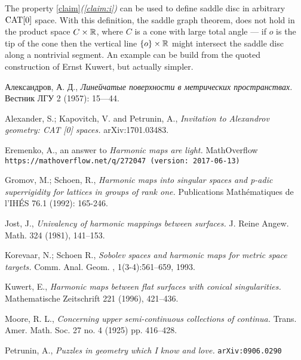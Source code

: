 \documentclass{article}
\begin{document}
The property \ref{claim}\textit{(\ref{claim:i})} can be used to define saddle disc in arbitrary $\mathop{\rm CAT}\nolimits[0]$ space.
With this definition, the saddle graph theorem, does not hold in the product space $C\times \mathbb{R}$, where $C$ is a cone with large total angle --- if $o$ is the tip of the cone then the vertical line $\{o\}\times\mathbb{R}$ might intersect the saddle disc along a nontrivial segment.
An example can be build from the quoted construction of Ernst Kuwert, but actually simpler.


\begin{thebibliography}{52}

 \begin{otherlanguage}{russian}
Александров, А. Д., 
\textit{Линейчатые поверхности в метрических пространствах.}
Вестник ЛГУ 2 (1957): 15---44.
\end{otherlanguage}

Alexander, S.; Kapovitch, V. and Petrunin, A.,
\textit{Invitation to Alexandrov geometry: CAT [0] spaces.}
arXiv:1701.03483.

 Eremenko, A., 
an answer to \textit{Harmonic maps are light.} MathOverflow
\texttt{https://mathoverflow.net/q/272047 (version: 2017-06-13)}

 Gromov, M.; Schoen, R., 
\textit{Harmonic maps into singular spaces and p-adic superrigidity for lattices in groups of rank one.} 
Publications Mathématiques de l'IHÉS 76.1 (1992): 165-246.

 Jost, J.,
\textit{Univalency of harmonic mappings between surfaces.}
J. Reine Angew. Math. 324 (1981), 141--153.

 Korevaar, N.; Schoen R., 
\textit{Sobolev spaces and harmonic maps for metric space targets.}
Comm. Anal. Geom. , 1(3-4):561–659, 1993.

 Kuwert, E.,
\textit{Harmonic maps between flat surfaces with conical singularities.}
Mathematische Zeitschrift 221 (1996), 421--436.

Moore, R. L.,
\textit{Concerning upper semi-continuous collections of continua.}
Trans. Amer. Math. Soc. 27 no. 4 (1925) pp. 416--428.

 Petrunin, A., 
\textit{Puzzles in geometry which I know and love.}
\texttt{arXiv:0906.0290}


\end{thebibliography}
\end{document}
